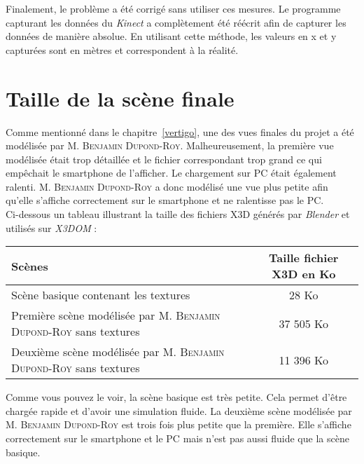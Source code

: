 Finalement, le problème a été corrigé sans utiliser ces mesures. Le programme capturant les données du \textit{Kinect} a complètement été réécrit afin de capturer les données de manière absolue. En utilisant cette méthode, les valeurs en x et y capturées sont en mètres et correspondent à la réalité. 


\section*{Taille de la scène finale}  \label{taille}

Comme mentionné dans le chapitre~\ref{vertigo}, une des vues finales du projet a été modélisée par \textsc{M. Benjamin Dupond-Roy}. Malheureusement, la première vue modélisée était trop détaillée et le fichier correspondant trop grand ce qui empêchait le smartphone de l'afficher. Le chargement sur PC était également ralenti. \textsc{M. Benjamin Dupond-Roy} a donc modélisé une vue plus petite afin qu'elle s'affiche correctement sur le \textsf{smartphone} et ne ralentisse pas le PC. \\
Ci-dessous un tableau illustrant la taille des fichiers X3D générés par \textit{Blender} et utilisés sur \textit{X3DOM} : 

\begin{center}
	\begin{tabular}{| l | c |}
	\hline
	\textbf{Scènes} & \textbf{Taille fichier X3D en Ko} \\ \hline
	Scène basique contenant les textures & 28 Ko \\\hline
	Première scène modélisée par \textsc{M. Benjamin Dupond-Roy} sans textures & 37 505 Ko \\ \hline
	Deuxième scène modélisée par \textsc{M. Benjamin Dupond-Roy} sans textures & 11 396 Ko \\ \hline
	\end{tabular}
\end{center}

Comme vous pouvez le voir, la scène basique est très petite. Cela permet d'être chargée rapide et d'avoir une simulation fluide. La deuxième scène modélisée par \textsc{M. Benjamin Dupond-Roy} est trois fois plus petite que la première. Elle s'affiche correctement sur le \textsf{smartphone} et le PC mais n'est pas aussi fluide que la scène basique.


